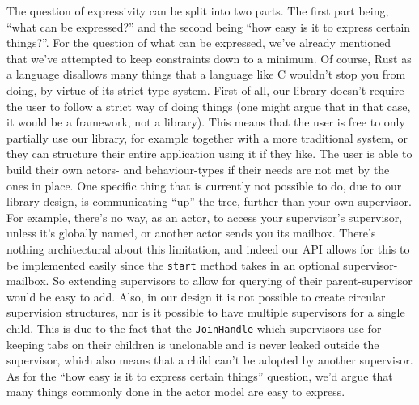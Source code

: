 \documentclass[a4paper]{article}
\begin{document}
The question of expressivity can be split into two parts. The first part being,
``what can be expressed?'' and the second being ``how easy is it to express
certain things?''. For the question of what can be expressed, we've already
mentioned that we've attempted to keep constraints down to a minimum. Of course,
Rust as a language disallows many things that a language like C wouldn't stop
you from doing, by virtue of its strict type-system. First of all, our library
doesn't require the user to follow a strict way of doing things (one might argue
that in that case, it would be a framework, not a library). This means that the
user is free to only partially use our library, for example together with a more
traditional system, or they can structure their entire application using it if
they like. The user is able to build their own actors- and behaviour-types if their
needs are not met by the ones in place. One specific thing that is currently not
possible to do, due to our library design, is communicating ``up''
the tree, further than your own supervisor. For example, there's no way, as an
actor, to access your supervisor's
supervisor, unless it's globally named, or another actor sends you its mailbox.
There's nothing architectural about this limitation, and indeed our API allows
for this to be implemented easily since the \texttt{start} method takes in an
optional supervisor-mailbox. So extending supervisors to allow for querying of
their parent-supervisor would be easy to add. Also, in our design it is not
possible to create circular supervision structures, nor is it possible to have
multiple supervisors for a single child. This is due to the fact that the
\texttt{JoinHandle} which supervisors use for keeping tabs on their children is
unclonable and is never leaked outside the supervisor, which also means that a
child can't be adopted by another supervisor.\\

\noindent
As for the ``how easy is it to express certain things'' question, we'd argue
that many things commonly done in the actor model are easy to express.
\end{document}
